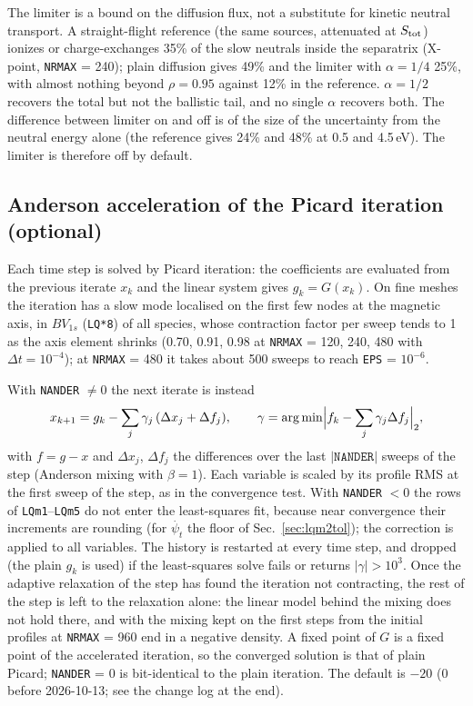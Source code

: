 \documentclass[11pt]{article}
\def\r#1{{\rm#1}}
\def\psit{\psi_t}
\def\psitd{\dot{\psit}}
\begin{document}
The limiter is a bound on the diffusion flux, not a substitute for kinetic
neutral transport.  A straight-flight reference (the same sources, attenuated at
$S_\r{tot}$) ionizes or charge-exchanges 35\% of the slow neutrals inside the
separatrix (X-point, \texttt{NRMAX} = 240); plain diffusion gives 49\% and the limiter
with $\alpha = 1/4$ 25\%, with almost nothing beyond $\rho = 0.95$ against 12\% in the
reference.  $\alpha = 1/2$ recovers the total but not the ballistic tail, and no
single $\alpha$ recovers both.  The difference between limiter on and off is of the
size of the uncertainty from the neutral energy alone (the reference gives 24\%
and 48\% at 0.5 and 4.5\,eV).  The limiter is therefore off by default.

\subsection{Anderson acceleration of the Picard iteration (optional)}
\label{sec:anderson}

Each time step is solved by Picard iteration: the coefficients are evaluated
from the previous iterate $x_k$ and the linear system gives $g_k = G(x_k)$.  On
fine meshes the iteration has a slow mode localised on the first few nodes at
the magnetic axis, in $BV_{1s}$ (\texttt{LQ*8}) of all species, whose contraction
factor per sweep tends to 1 as the axis element shrinks (0.70, 0.91, 0.98 at
\texttt{NRMAX} = 120, 240, 480 with $\Delta t = 10^{-4}$); at \texttt{NRMAX} = 480
it takes about 500 sweeps to reach \texttt{EPS} = $10^{-6}$.

With \texttt{NANDER} $\ne 0$ the next iterate is instead
\[
  x_{k+1} = g_k - \sum_j \gamma_j\,(\Delta x_j + \Delta f_j),\qquad
  \gamma = \arg\min\Bigl|f_k - \sum_j \gamma_j \Delta f_j\Bigr|_2,
\]
with $f = g - x$ and $\Delta x_j$, $\Delta f_j$ the differences over the last
$|\texttt{NANDER}|$ sweeps of the step (Anderson mixing with $\beta = 1$).  Each
variable is scaled by its profile RMS at the first sweep of the step, as in the
convergence test.  With \texttt{NANDER} $< 0$ the rows of \texttt{LQm1}--\texttt{LQm5} do not
enter the least-squares fit, because near convergence their increments are
rounding (for $\psitd$ the floor of Sec.~\ref{sec:lqm2tol}); the correction is
applied to all variables.  The history
is restarted at every time step, and dropped (the plain $g_k$ is used) if the
least-squares solve fails or returns $|\gamma| > 10^3$.  Once the adaptive
relaxation of the step has found the iteration not contracting, the rest of the
step is left to the relaxation alone: the linear model behind the mixing does not
hold there, and with the mixing kept on the first steps from the initial profiles
at \texttt{NRMAX} = 960 end in a negative density.  A fixed point of $G$ is
a fixed point of the accelerated iteration, so the converged solution is that of
plain Picard; \texttt{NANDER} = 0 is bit-identical to the plain iteration.  The default
is $-20$ (0 before 2026-10-13; see the change log at the end).
\end{document}
